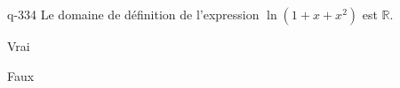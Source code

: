 \begin{truefalse}{q-334}
Le domaine de définition de l'expression $\ln(1+x+x^2)$ est $\mathbb{R}$.
\item* Vrai
\item Faux
\end{truefalse}

